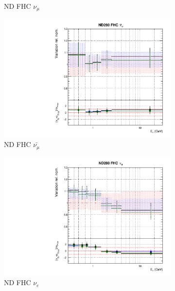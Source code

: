 \begin{figure}[!htbp]
\begin{subfigure}{0.49\textwidth}
  \caption{ND FHC $\nu_{\mu}$}
\end{subfigure}
\begin{subfigure}{0.49\textwidth}
  \centering
  \includegraphics[width=0.99\linewidth]{figs/polydataflux_1}
  \caption{ND FHC $\bar{\nu_{\mu}}$}
\end{subfigure}
\begin{subfigure}{0.49\textwidth}
  \centering
  \includegraphics[width=0.99\linewidth]{figs/polydataflux_2}
  \caption{ND FHC $\nu_e$}
\end{subfigure}
\begin{subfigure}{0.49\textwidth}
  \centering

\end{subfigure}
\end{figure}
